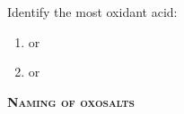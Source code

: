 \documentclass[main.tex]{subfiles}
\begin{document}
\begin{multicols*}{2}
\begin{question}[ID=\the\value{numA}]
Identify the most oxidant acid: 
 \noindent
  \begin{multicols}{2}
  \begin{enumerate} [topsep=0pt, partopsep=1pt, label=(\alph*), leftmargin=0.5cm]	
\item {} or  \iffalse \ce{H2S2\textsuperscript{V}O6} \fi
\item {} or  \iffalse \ce{H2Se\textsuperscript{IV}O3} \fi
\end{enumerate}
 \end{multicols} 
\end{question}
\begin{solution}
\begin{inparaenum}[(a)]
\item   {}  
\item   {}    
 \end{inparaenum}
\hspace{0.1cm}\end{solution}%



{\raggedright\textsc{\textbf{Naming of oxosalts}}\par}



\end{multicols*}
\end{document}
